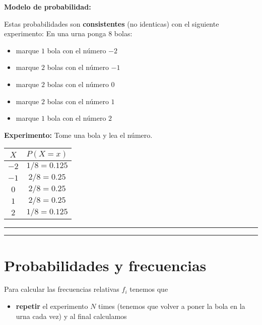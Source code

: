 \documentclass[
]{book}
\providecommand{\tightlist}{%
  \setlength{\itemsep}{0pt}\setlength{\parskip}{0pt}}
\begin{document}
\textbf{Modelo de probabilidad:}

Estas probabilidades son \textbf{consistentes} (no identicas) con el siguiente experimento: En una urna ponga \(8\) bolas:

\begin{itemize}
\tightlist
\item
  marque \(1\) bola con el número \(-2\)
\item
  marque \(2\) bolas con el número \(-1\)
\item
  marque \(2\) bolas con el número \(0\)
\item
  marque \(2\) bolas con el número \(1\)
\item
  marque \(1\) bola con el número \(2\)
\end{itemize}

\textbf{Experimento:} Tome una bola y lea el número.

\begin{longtable}[]{@{}cc@{}}
\toprule
\(X\) & \(P(X=x)\) \\
\midrule
\endhead
\(-2\) & \(1/8=0.125\) \\
\(-1\) & \(2/8=0.25\) \\
\(0\) & \(2/8=0.25\) \\
\(1\) & \(2/8=0.25\) \\
\(2\) & \(1/8=0.125\) \\
\bottomrule
\end{longtable}

\begin{center}\rule{0.5\linewidth}{0.5pt}\end{center}

\begin{center}\rule{0.5\linewidth}{0.5pt}\end{center}

\hypertarget{probabilidades-y-frecuencias}{%
\section{Probabilidades y frecuencias}\label{probabilidades-y-frecuencias}}

Para calcular las frecuencias relativas \(f_i\) tenemos que

\begin{itemize}
\tightlist
\item
  \textbf{repetir} el experimento \(N\) times (tenemos que volver a poner la bola en la urna cada vez) y al final calculamos
\end{itemize}
\end{document}
